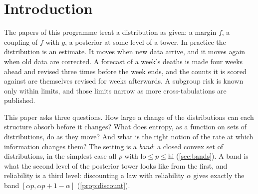\documentclass[11pt]{article}
\theoremstyle{definition}
\theoremstyle{remark}
\begin{document}
\begin{abstract}
fast the calibrated view can change and prevents the break. Two pilots on public data, NHANES subgroups and
COVID-19 ensemble forecasts with their revision history, show much of the predicted behaviour: bands shrink up an
information ladder, narrow structural bands must be combined with sampling bands to predict new data, decisive bands cross
walls by straddling them, small margins predict tearing, and forecasts built on data that was later heavily revised lose
almost half their coverage. The speed term of the tear time does not yet improve on the margin. A protocol for clinical data separates
the statements that are theorems from those that can fail, and it is validated on synthetic data with planted effects.
\end{abstract}

\tableofcontents

\section{Introduction}\label{sec:intro}

The papers of this programme treat a distribution as given: a margin $f$, a coupling of $f$ with $g$, a posterior at some
level of a tower. In practice the distribution is an estimate. It moves when new data arrive, and it moves again when old data
are corrected. A forecast of a week's deaths is made four weeks ahead and revised three times before the week ends, and the counts it is scored
against are themselves revised for weeks afterwards. A subgroup risk is known only within limits, and those limits narrow
as more cross-tabulations are published.

This paper asks three questions. How large a change of the distributions can each structure absorb before it changes?
What does entropy, as a function on sets of distributions, do as they move? And what is the right notion of the rate at
which information changes them? The setting is a \emph{band}: a closed convex set of distributions, in the simplest case all
$p$ with $\mathrm{lo}\le p\le\mathrm{hi}$ (\cref{sec:bands}). A band is what the second level of the posterior tower
\cite{Tower} looks like from the first, and reliability is a third level: discounting a law with reliability $\alpha$ gives
exactly the band $[\alpha p,\alpha p+1-\alpha]$ (\cref{prop:discount}).
\end{document}
